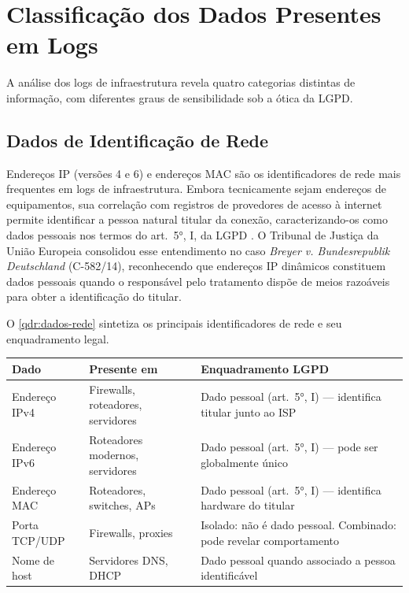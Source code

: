 \section{Classificação dos Dados Presentes em Logs}
\label{sec:classificacao}

A análise dos logs de infraestrutura revela quatro categorias distintas de informação, com diferentes graus de sensibilidade sob a ótica da LGPD.

\subsection{Dados de Identificação de Rede}
\label{subsec:dados-rede}

Endereços IP (versões 4 e 6) e endereços MAC são os identificadores de rede mais frequentes em logs de infraestrutura. Embora tecnicamente sejam endereços de equipamentos, sua correlação com registros de provedores de acesso à internet permite identificar a pessoa natural titular da conexão, caracterizando-os como dados pessoais nos termos do art.\ 5°, I, da LGPD \cite{brasil2018lgpd}. O Tribunal de Justiça da União Europeia consolidou esse entendimento no caso \textit{Breyer v. Bundesrepublik Deutschland} (C-582/14), reconhecendo que endereços IP dinâmicos constituem dados pessoais quando o responsável pelo tratamento dispõe de meios razoáveis para obter a identificação do titular.

O \autoref{qdr:dados-rede} sintetiza os principais identificadores de rede e seu enquadramento legal.

\begin{quadro}[htb]
    \caption{\label{qdr:dados-rede}Dados de identificação de rede em logs e enquadramento na LGPD}
    \begin{tabular}{|p{3cm}|p{4cm}|p{6.8cm}|}
        \hline
        \textbf{Dado} & \textbf{Presente em} & \textbf{Enquadramento LGPD} \\
        \hline
        Endereço IPv4 & Firewalls, roteadores, servidores & Dado pessoal (art.\ 5°, I) — identifica titular junto ao ISP \\
        \hline
        Endereço IPv6 & Roteadores modernos, servidores & Dado pessoal (art.\ 5°, I) — pode ser globalmente único \\
        \hline
        Endereço MAC & Roteadores, switches, APs & Dado pessoal (art.\ 5°, I) — identifica hardware do titular \\
        \hline
        Porta TCP/UDP & Firewalls, proxies & Isolado: não é dado pessoal. Combinado: pode revelar comportamento \\
        \hline
        Nome de host & Servidores DNS, DHCP & Dado pessoal quando associado a pessoa identificável \\
        \hline
    \end{tabular}
\end{quadro}


